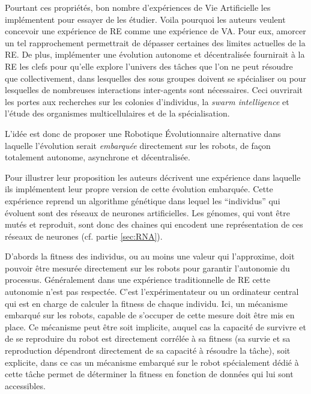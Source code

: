 Pourtant ces propriétés, bon nombre d'expériences de Vie Artificielle les implémentent pour essayer de les étudier. Voila pourquoi les auteurs veulent concevoir une expérience de RE comme une expérience de VA. Pour eux, amorcer un tel rapprochement permettrait de dépasser certaines des limites actuelles de la RE. De plus, implémenter une évolution autonome et décentralisée fournirait à la RE les clefs pour qu'elle explore l'univers des tâches que l'on ne peut résoudre que collectivement, dans lesquelles des sous groupes doivent se spécialiser ou pour lesquelles de nombreuses interactions inter-agents sont nécessaires. Ceci ouvrirait les portes aux recherches sur les colonies d'individus, la \emph{swarm intelligence} \citep{garnier2007biologicalprincipeswarmintelligence} et l'étude des organismes multicellulaires et de la spécialisation.

L'idée est donc de proposer une Robotique \'Evolutionnaire alternative dans laquelle l'évolution serait \emph{embarquée} directement sur les robots, de façon totalement autonome, asynchrone et décentralisée.

Pour illustrer leur proposition les auteurs décrivent une expérience dans laquelle ils implémentent leur propre version de cette évolution embarquée. Cette expérience reprend un algorithme génétique dans lequel les ``individus'' qui évoluent sont des réseaux de neurones artificielles. Les génomes, qui vont être mutés et reproduit, sont donc des chaines qui encodent une représentation de ces réseaux de neurones (cf. partie \ref{sec:RNA}).

D'abords la fitness des individus, ou au moins une valeur qui l'approxime, doit pouvoir être mesurée directement sur les robots pour garantir l'autonomie du processus. Généralement dans une expérience traditionnelle de RE cette autonomie n'est pas respectée. C'est l'expérimentateur ou un ordinateur central qui est en charge de calculer la fitness de chaque individu. Ici, un mécanisme embarqué sur les robots, capable de s'occuper de cette mesure doit être mis en place. Ce mécanisme peut être soit implicite, auquel cas la capacité de survivre et de se reproduire du robot est directement corrélée à sa fitness (sa survie et sa reproduction dépendront directement de sa capacité à résoudre la tâche), soit explicite, dans ce cas un mécanisme embarqué sur le robot spécialement dédié à cette tâche permet de déterminer la fitness en fonction de données qui lui sont accessibles.

